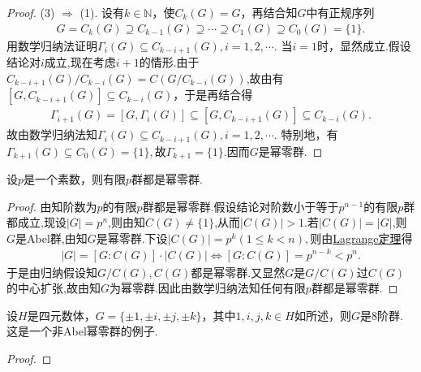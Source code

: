 \documentclass[../../main.tex]{subfiles}%
\begin{document}
\begin{proof}
(3) $\Rightarrow$ (1). 设有$k\in \mathbb{N}$，使$C_k(G) = G$，再结合知$G$中有正规序列
\begin{align*}
G = C_k(G) \supseteq C_{k-1}(G) \supseteq \cdots \supseteq C_1(G) \supseteq C_0(G) = \{1\}.
\end{align*}
用数学归纳法证明$\Gamma_i(G) \subseteq C_{k - i + 1}(G),i=1,2,\cdots$. 当$i = 1$时，显然成立.假设结论对$i$成立,现在考虑$i+1$的情形.由于$C_{k - i + 1}(G)/C_{k - i}(G) = C(G/C_{k - i}(G))$,故由有$[G, C_{k - i + 1}(G)] \subseteq C_{k - i}(G)$，于是再结合得
\begin{align*}
\Gamma_{i+1}(G) = [G, \Gamma_i(G)] \subseteq [G, C_{k - i + 1}(G)] \subseteq C_{k - i}(G).
\end{align*}
故由数学归纳法知$\Gamma_i(G) \subseteq C_{k - i + 1}(G),i=1,2,\cdots$.
特别地，有$\Gamma_{k+1}(G) \subseteq C_0(G) = \{1\},$故$\Gamma_{k+1}=\{1\}$.因而$G$是幂零群.

\end{proof}

\begin{theorem}
设$p$是一个素数，则有限$p$群都是幂零群.
\end{theorem}
\begin{proof}

由知阶数为$p$的有限$p$群都是幂零群.假设结论对阶数小于等于$p^{n-1}$的有限$p$群都成立,现设$|G|=p^n$,则由知$C(G) \neq \{1\}$,从而$|C(G)|>1.$若$|C(G)|=|G|$,则$G$是Abel群,由知$G$是幂零群.下设$|C(G)|=p^k(1\leqslant k<n),$则由\hyperref[theorem:抽象代数--Lagrange定理]{Lagrange定理}得
\begin{align*}
\left| G \right|=\left[ G:C\left( G \right) \right] \cdot \left| C\left( G \right) \right|\Longleftrightarrow \left[ G:C\left( G \right) \right] =p^{n-k}<p^n.
\end{align*}
于是由归纳假设知$G/C\left( G \right) ,C\left( G \right) $都是幂零群.又显然$G$是$G/C(G)$过$C(G)$的中心扩张,故由知$G$为幂零群.因此由数学归纳法知任何有限$p$群都是幂零群.

\end{proof}

\begin{example}
设$H$是四元数体，$G = \{\pm 1, \pm i, \pm j, \pm k\}$，其中$1, i, j, k \in H$如所述，则$G$是8阶群. 这是一个非Abel幂零群的例子.
\end{example}
\begin{proof}



\end{proof}
\end{document}
